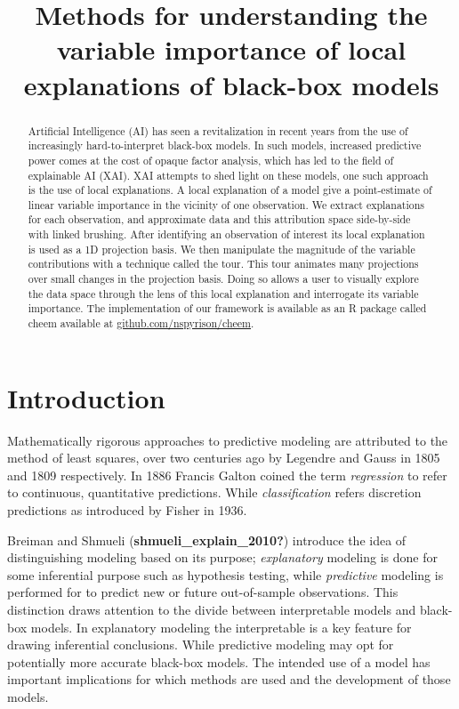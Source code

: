\documentclass[
]{article}
\title{Methods for understanding the variable importance of local explanations of black-box models}
\author{}
\date{\vspace{-2.5em}}
\begin{document}
\maketitle
\begin{abstract}
Artificial Intelligence (AI) has seen a revitalization in recent years from the use of increasingly hard-to-interpret black-box models. In such models, increased predictive power comes at the cost of opaque factor analysis, which has led to the field of explainable AI (XAI). XAI attempts to shed light on these models, one such approach is the use of local explanations. A local explanation of a model give a point-estimate of linear variable importance in the vicinity of one observation. We extract explanations for each observation, and approximate data and this attribution space side-by-side with linked brushing. After identifying an observation of interest its local explanation is used as a 1D projection basis. We then manipulate the magnitude of the variable contributions with a technique called the tour. This tour animates many projections over small changes in the projection basis. Doing so allows a user to visually explore the data space through the lens of this local explanation and interrogate its variable importance. The implementation of our framework is available as an R package called cheem available at \href{https://github.com/nspyrison/cheem}{github.com/nspyrison/cheem}.
\end{abstract}

\hypertarget{sec:intro}{%
\section{Introduction}\label{sec:intro}}

Mathematically rigorous approaches to predictive modeling are attributed to the method of least squares, over two centuries ago by Legendre and Gauss in 1805 and 1809 respectively. In 1886 Francis Galton coined the term \emph{regression} to refer to continuous, quantitative predictions. While \emph{classification} refers discretion predictions as introduced by Fisher in 1936.

Breiman and Shmueli (\textbf{shmueli\_explain\_2010?}) introduce the idea of distinguishing modeling based on its purpose; \emph{explanatory} modeling is done for some inferential purpose such as hypothesis testing, while \emph{predictive} modeling is performed for to predict new or future out-of-sample observations. This distinction draws attention to the divide between interpretable models and black-box models. In explanatory modeling the interpretable is a key feature for drawing inferential conclusions. While predictive modeling may opt for potentially more accurate black-box models. The intended use of a model has important implications for which methods are used and the development of those models.
\end{document}
